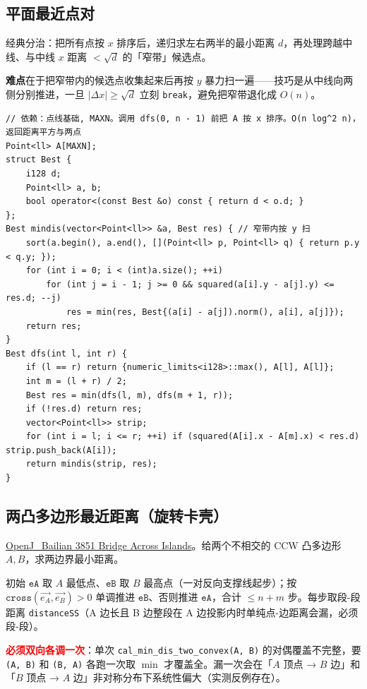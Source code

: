 		\subsection{平面最近点对}

		经典分治：把所有点按 $x$ 排序后，递归求左右两半的最小距离 $d$，再处理跨越中线、与中线 $x$ 距离 $< \sqrt{d}$ 的「窄带」候选点。

		\textbf{难点}在于把窄带内的候选点收集起来后再按 $y$ 暴力扫一遍——技巧是从中线向两侧分别推进，一旦 $|\Delta x| \ge \sqrt{d}$ 立刻 \texttt{break}，避免把窄带退化成 $O(n)$。

\begin{verbatim}
// 依赖：点线基础, MAXN。调用 dfs(0, n - 1) 前把 A 按 x 排序。O(n log^2 n)，返回距离平方与两点
Point<ll> A[MAXN];
struct Best {
	i128 d;
	Point<ll> a, b;
	bool operator<(const Best &o) const { return d < o.d; }
};
Best mindis(vector<Point<ll>> &a, Best res) { // 窄带内按 y 扫
	sort(a.begin(), a.end(), [](Point<ll> p, Point<ll> q) { return p.y < q.y; });
	for (int i = 0; i < (int)a.size(); ++i)
		for (int j = i - 1; j >= 0 && squared(a[i].y - a[j].y) <= res.d; --j)
			res = min(res, Best{(a[i] - a[j]).norm(), a[i], a[j]});
	return res;
}
Best dfs(int l, int r) {
	if (l == r) return {numeric_limits<i128>::max(), A[l], A[l]};
	int m = (l + r) / 2;
	Best res = min(dfs(l, m), dfs(m + 1, r));
	if (!res.d) return res;
	vector<Point<ll>> strip;
	for (int i = l; i <= r; ++i) if (squared(A[i].x - A[m].x) < res.d) strip.push_back(A[i]);
	return mindis(strip, res);
}
\end{verbatim}

		\subsection{两凸多边形最近距离（旋转卡壳）}

		\href{https://vjudge.net/problem/OpenJ_Bailian-3851}{OpenJ\_Bailian 3851 Bridge Across Islands}。给两个不相交的 CCW 凸多边形 $A, B$，求两边界最小距离。

		初始 $\texttt{eA}$ 取 $A$ 最低点、$\texttt{eB}$ 取 $B$ 最高点（一对反向支撑线起步）；按 $\texttt{cross}(\vec{e_A}, \vec{e_B}) > 0$ 单调推进 $\texttt{eB}$、否则推进 $\texttt{eA}$，合计 $\le n + m$ 步。每步取段-段距离 \texttt{distanceSS}（A 边长且 B 边整段在 A 边投影内时单纯点-边距离会漏，必须段-段）。

		\textcolor{red}{\textbf{必须双向各调一次}}：单次 \texttt{cal\_min\_dis\_two\_convex(A, B)} 的对偶覆盖不完整，要 \texttt{(A, B)} 和 \texttt{(B, A)} 各跑一次取 $\min$ 才覆盖全。漏一次会在「$A$ 顶点 → $B$ 边」和「$B$ 顶点 → $A$ 边」非对称分布下系统性偏大（实测反例存在）。

